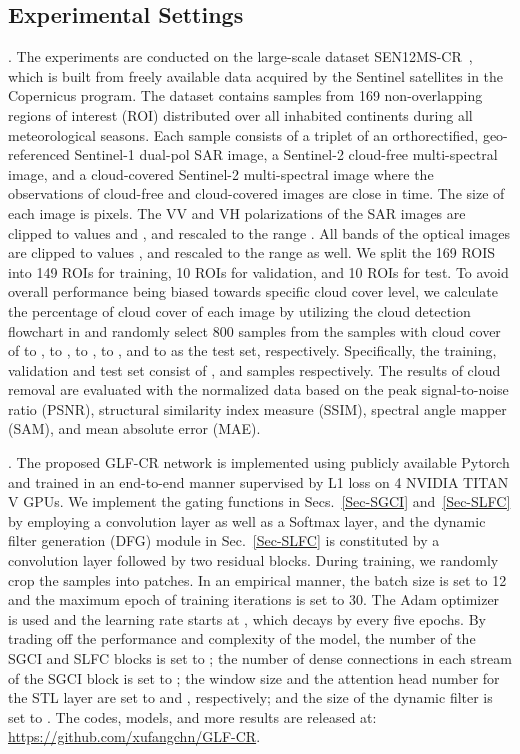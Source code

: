 \documentclass[a4paper,fleqn]{cas-dc}
\begin{document}
\subsection{Experimental Settings}
.
The experiments are conducted on the large-scale dataset SEN12MS-CR~\citep{ebel2020multisensor}, which is built from freely available data acquired by the Sentinel satellites in the Copernicus program. The dataset contains  samples from 169 non-overlapping regions of interest (ROI) distributed over all inhabited continents during all meteorological seasons. Each sample consists of a triplet of an orthorectified, geo-referenced Sentinel-1 dual-pol SAR image, a Sentinel-2 cloud-free multi-spectral image, and a cloud-covered Sentinel-2 multi-spectral image where the observations of cloud-free and cloud-covered images are close in time. The size of each image is  pixels. 
The VV and VH polarizations of the SAR images are clipped to values  and , and rescaled to the range . All bands of the optical images are clipped to values , and rescaled to the range  as well. 
We split the 169 ROIS into 149 ROIs for training, 10 ROIs for validation, and 10 ROIs for test. To avoid overall performance being biased towards specific cloud cover level, we calculate the percentage of cloud cover of each image by utilizing the cloud detection flowchart in \cite{meraner2020cloud} and randomly select 800 samples from the samples with cloud cover of  to ,  to ,  to ,  to , and  to  as the test set, respectively. Specifically, the training, validation and test set consist of ,  and  samples respectively. 
The results of cloud removal are evaluated with the normalized data based on the peak signal-to-noise ratio (PSNR), structural similarity index measure (SSIM), spectral angle mapper (SAM), and mean absolute error (MAE).

. 
The proposed GLF-CR network is implemented using publicly available Pytorch and trained in an end-to-end manner supervised by L1 loss on 4 NVIDIA TITAN V GPUs. We implement the gating functions in Secs.~\ref{Sec-SGCI} and~\ref{Sec-SLFC} by employing a convolution layer as well as a Softmax layer, and the dynamic filter generation (DFG) module in Sec.~\ref{Sec-SLFC} is constituted by a convolution layer followed by two residual blocks. 
During training, we randomly crop the samples into  patches. In an empirical manner, the batch size is set to 12 and the maximum epoch of training iterations is set to 30. The Adam optimizer is used and the learning rate starts at , which decays by  every five epochs. By trading off the performance and complexity of the model, the number of the SGCI and SLFC blocks  is set to ; the number of dense connections in each stream of the SGCI block is set to ; the window size and the attention head number for the STL layer are set to  and , respectively; and the size of the dynamic filter  is set to . The codes, models, and more results are released at: \url{https://github.com/xufangchn/GLF-CR}.
\end{document}
